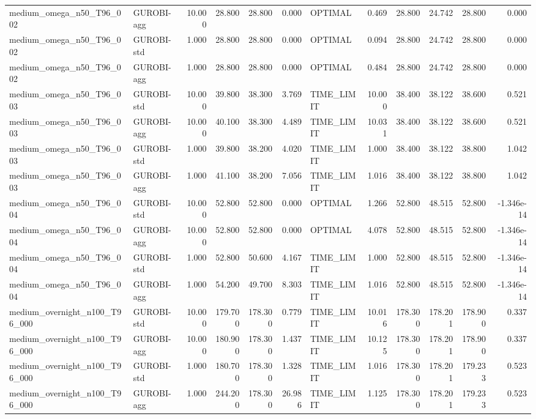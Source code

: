 \begin{table}[htbp]
\begin{tabular}{llrrrrlrrrrr}
medium\_omega\_n50\_T96\_002 & GUROBI-agg & 10.000 & 28.800 & 28.800 & 0.000 & OPTIMAL & 0.469 & 28.800 & 24.742 & 28.800 & 0.000 \\
medium\_omega\_n50\_T96\_002 & GUROBI-std & 1.000 & 28.800 & 28.800 & 0.000 & OPTIMAL & 0.094 & 28.800 & 24.742 & 28.800 & 0.000 \\
medium\_omega\_n50\_T96\_002 & GUROBI-agg & 1.000 & 28.800 & 28.800 & 0.000 & OPTIMAL & 0.484 & 28.800 & 24.742 & 28.800 & 0.000 \\
medium\_omega\_n50\_T96\_003 & GUROBI-std & 10.000 & 39.800 & 38.300 & 3.769 & TIME\_LIMIT & 10.000 & 38.400 & 38.122 & 38.600 & 0.521 \\
medium\_omega\_n50\_T96\_003 & GUROBI-agg & 10.000 & 40.100 & 38.300 & 4.489 & TIME\_LIMIT & 10.031 & 38.400 & 38.122 & 38.600 & 0.521 \\
medium\_omega\_n50\_T96\_003 & GUROBI-std & 1.000 & 39.800 & 38.200 & 4.020 & TIME\_LIMIT & 1.000 & 38.400 & 38.122 & 38.800 & 1.042 \\
medium\_omega\_n50\_T96\_003 & GUROBI-agg & 1.000 & 41.100 & 38.200 & 7.056 & TIME\_LIMIT & 1.016 & 38.400 & 38.122 & 38.800 & 1.042 \\
medium\_omega\_n50\_T96\_004 & GUROBI-std & 10.000 & 52.800 & 52.800 & 0.000 & OPTIMAL & 1.266 & 52.800 & 48.515 & 52.800 & -1.346e-14 \\
medium\_omega\_n50\_T96\_004 & GUROBI-agg & 10.000 & 52.800 & 52.800 & 0.000 & OPTIMAL & 4.078 & 52.800 & 48.515 & 52.800 & -1.346e-14 \\
medium\_omega\_n50\_T96\_004 & GUROBI-std & 1.000 & 52.800 & 50.600 & 4.167 & TIME\_LIMIT & 1.000 & 52.800 & 48.515 & 52.800 & -1.346e-14 \\
medium\_omega\_n50\_T96\_004 & GUROBI-agg & 1.000 & 54.200 & 49.700 & 8.303 & TIME\_LIMIT & 1.016 & 52.800 & 48.515 & 52.800 & -1.346e-14 \\
medium\_overnight\_n100\_T96\_000 & GUROBI-std & 10.000 & 179.700 & 178.300 & 0.779 & TIME\_LIMIT & 10.016 & 178.300 & 178.201 & 178.900 & 0.337 \\
medium\_overnight\_n100\_T96\_000 & GUROBI-agg & 10.000 & 180.900 & 178.300 & 1.437 & TIME\_LIMIT & 10.125 & 178.300 & 178.201 & 178.900 & 0.337 \\
medium\_overnight\_n100\_T96\_000 & GUROBI-std & 1.000 & 180.700 & 178.300 & 1.328 & TIME\_LIMIT & 1.016 & 178.300 & 178.201 & 179.233 & 0.523 \\
medium\_overnight\_n100\_T96\_000 & GUROBI-agg & 1.000 & 244.200 & 178.300 & 26.986 & TIME\_LIMIT & 1.125 & 178.300 & 178.201 & 179.233 & 0.523 \\

\end{tabular}
\end{table}
